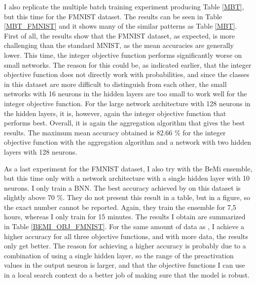 \noindent I also replicate the multiple batch training experiment producing Table \ref{MBT}, but this time for the FMNIST dataset. The results can be seen in Table \ref{MBT_FMNIST} and it shows many of the similar patterns as Table \ref{MBT}. First of all, the results show that the FMNIST dataset, as expected, is more challenging than the standard MNIST, as the mean accuracies are generally lower. This time, the integer objective function performs significantly worse on small networks. The reason for this could be, as indicated earlier, that the integer objective function does not directly work with probabilities, and since the classes in this dataset are more difficult to distinguish from each other, the small networks with 16 neurons in the hidden layers are too small to work well for the integer objective function. For the large network architecture with 128 neurons in the hidden layers, it is, however, again the integer objective function that performs best. Overall, it is again the aggregation algorithm that gives the best results. The maximum mean accuracy obtained is 82.66 \% for the integer objective function with the aggregation algorithm and a network with two hidden layers with 128 neurons. 

\noindent As a last experiment for the FMNIST dataset, I also try with the BeMi ensemble, but this time only with a network architecture with a single hidden layer with 10 neurons. I only train a BNN. The best accuracy achieved by \cite{ambrogio2023} on this dataset is slightly above 70 \%. They do not present this result in a table, but in a figure, so the exact number cannot be reported. Again, they train the ensemble for 7,5 hours, whereas I only train for 15 minutes. The results I obtain are summarized in Table \ref{BEMI_OBJ_FMNIST}. For the same amount of data as \cite{ambrogio2023}, I achieve a higher accuracy for all three objective functions, and with more data, the results only get better. The reason for achieving a higher accuracy is probably due to a combination of using a single hidden layer, so the range of the preactivation values in the output neuron is larger, and that the objective functions I can use in a local search context do a better job of making sure that the model is robust. 



